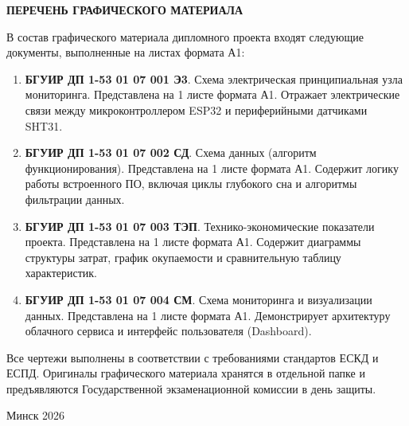 \newpage
\begin{center}
    {\bfseries ПЕРЕЧЕНЬ ГРАФИЧЕСКОГО МАТЕРИАЛА}
\end{center}


\vspace{1cm}

\noindent В состав графического материала дипломного проекта входят следующие документы, выполненные на листах формата А1:

\vspace{0.5cm}

\begin{enumerate}
    \item \textbf{БГУИР ДП 1-53 01 07 001 Э3}. Схема электрическая принципиальная узла мониторинга. Представлена на 1 листе формата А1. Отражает электрические связи между микроконтроллером ESP32 и периферийными датчиками SHT31.
    
    \item \textbf{БГУИР ДП 1-53 01 07 002 СД}. Схема данных (алгоритм функционирования). Представлена на 1 листе формата А1. Содержит логику работы встроенного ПО, включая циклы глубокого сна и алгоритмы фильтрации данных.
    
    \item \textbf{БГУИР ДП 1-53 01 07 003 ТЭП}. Технико-экономические показатели проекта. Представлена на 1 листе формата А1. Содержит диаграммы структуры затрат, график окупаемости и сравнительную таблицу характеристик.
    
    \item \textbf{БГУИР ДП 1-53 01 07 004 СМ}. Схема мониторинга и визуализации данных. Представлена на 1 листе формата А1. Демонстрирует архитектуру облачного сервиса и интерфейс пользователя (Dashboard).
\end{enumerate}

\vspace{1cm}

\noindent Все чертежи выполнены в соответствии с требованиями стандартов ЕСКД и ЕСПД. Оригиналы графического материала хранятся в отдельной папке и предъявляются Государственной экзаменационной комиссии в день защиты.

\vfill
\begin{center}
    Минск 2026
\end{center}

\newpage